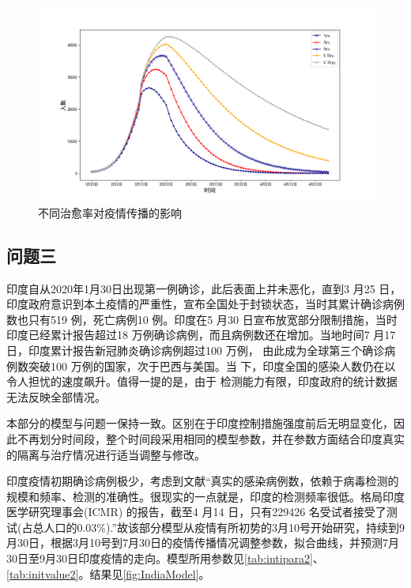 \documentclass[withoutpre]{cumcmthesis} %
\begin{document}
\begin{figure}[!h]
    \centering
    \includegraphics[width=1.0\textwidth]{figures/yh.png}
    \caption{不同治愈率对疫情传播的影响}
    \label{fig:gamma}
\end{figure}



\subsection{问题三}
印度自从2020年1月30日出现第一例确诊，此后表面上并未恶化，直到3 月25 日，印度政府意识到本土疫情的严重性，宣布全国处于封锁状态，当时其累计确诊病例数也只有519 例，死亡病例10 例。印度在5 月30 日宣布放宽部分限制措施，当时印度已经累计报告超过18 万例确诊病例，而且病例数还在增加。当地时间7 月17 日，印度累计报告新冠肺炎确诊病例超过100 万例，
由此成为全球第三个确诊病例数突破100 万例的国家，次于巴西与美国。当
下，印度全国的感染人数仍在以令人担忧的速度飙升。值得一提的是，由于
检测能力有限，印度政府的统计数据无法反映全部情况。


本部分的模型与问题一保持一致。区别在于印度控制措施强度前后无明显变化，因此不再划分时间段，整个时间段采用相同的模型参数，并在参数方面结合印度真实的隔离与治疗情况进行适当调整与修改。

印度疫情初期确诊病例极少，考虑到文献\cite{reference4}“真实的感染病例数，依赖于病毒检测的规模和频率、检测的准确性。很现实的一点就是，印度的检测频率很低。格局印度医学研究理事会(ICMR) 的报告，截至4 月14 日，只有229426 名受试者接受了测试(占总人口的0.03\%).”故该部分模型从疫情有所初势的3月10号开始研究，持续到9月30日，根据3月10号到7月30日的疫情传播情况调整参数，拟合曲线，并预测7月30日至9月30日印度疫情的走向。模型所用参数见\cref{tab:intipara2}、\cref{tab:initvalue2}。结果见\cref{fig:IndiaModel}。
\end{document}
